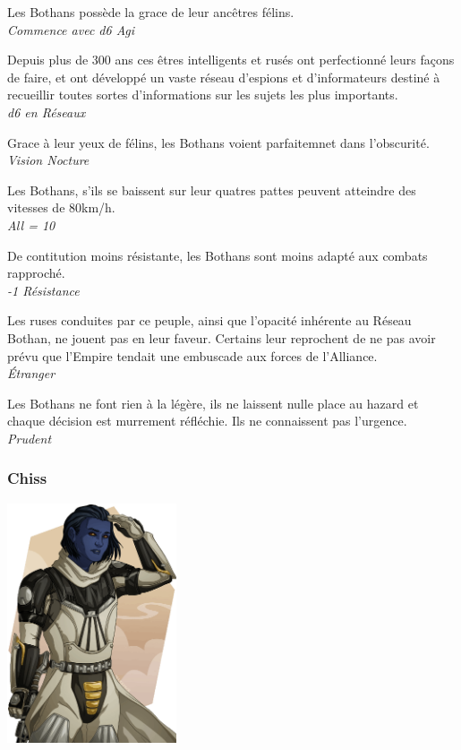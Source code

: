 \begin{description}[align=left]
\item [Agilité du Félin] 			%
		Les Bothans possède la grace de leur ancêtres félins.\\
		\emph{Commence avec d6 Agi}
\item [Service de renseignement] 	%
		Depuis plus de 300 ans ces êtres intelligents et rusés ont perfectionné leurs façons de faire, et ont développé un vaste réseau d'espions et d'informateurs destiné à recueillir toutes sortes d'informations sur les sujets les plus importants.\\
		\emph{d6 en Réseaux}
\item [Comme en plein jour] 		%
		Grace à leur yeux de félins, les Bothans voient parfaitemnet dans l'obscurité.\\
		\emph{Vision Nocture}
\item [Déplacement rapide] 			%
		Les Bothans, s'ils se baissent sur leur quatres pattes peuvent atteindre des vitesses de 80km/h.\\
		\emph{All = 10}
\item [Frêle] 						%
		De contitution moins résistante, les Bothans sont moins adapté aux combats rapproché.\\
		\emph{-1 Résistance}
\item [Mauvaise réputation] 		%
		Les ruses conduites par ce peuple, ainsi que l'opacité inhérente au Réseau Bothan, ne jouent pas en leur faveur. Certains leur reprochent de ne pas avoir prévu que l'Empire tendait une embuscade aux forces de l'Alliance.\\
		\emph{\'Etranger}
\item [Prudent] 					%
		Les Bothans ne font rien à la légère, ils ne laissent nulle place au hazard et chaque décision est murrement réfléchie. Ils ne connaissent pas l'urgence.\\
		\emph{Prudent}
\end{description}

\subsubsection{Chiss}
\includegraphics[width=5cm]{img/races/chiss.png}


